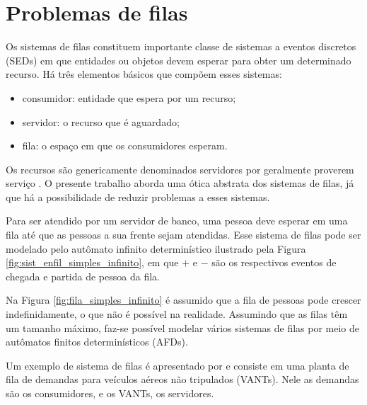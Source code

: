 \chapter{Problemas de filas}

Os sistemas de filas constituem importante classe de sistemas a eventos discretos (\acs{SED}s) em que entidades ou objetos devem esperar para obter um determinado recurso. Há três elementos básicos que compõem esses sistemas: \begin{itemize}
	\item consumidor: entidade que espera por um recurso;
	\item servidor: o recurso que é aguardado;
	\item fila: o espaço em que os consumidores esperam.
\end{itemize} Os recursos são genericamente denominados servidores por geralmente proverem serviço \cite{cassandras}. O presente trabalho aborda uma ótica abstrata dos sistemas de filas, já que há a possibilidade de reduzir problemas a esses sistemas.

Para ser atendido por um servidor de banco, uma pessoa deve esperar em uma fila até que as pessoas a sua frente sejam atendidas. Esse sistema de filas pode ser modelado pelo autômato infinito determinístico ilustrado pela Figura \ref{fig:sist_enfil_simples_infinito}, em que $+$ e $-$ são os respectivos eventos de chegada e partida de pessoa da fila.


Na Figura \ref{fig:fila_simples_infinito} é assumido que a fila de pessoas pode crescer indefinidamente, o que não é possível na realidade. Assumindo que as filas têm um tamanho máximo, faz-se possível modelar vários sistemas de filas por meio de autômatos finitos determinísticos (AFDs).

Um exemplo de sistema de filas é apresentado por  e consiste em uma planta de fila de demandas para veículos aéreos não tripulados (\acs{VANT}s). Nele as demandas são os consumidores, e os VANTs, os servidores.

